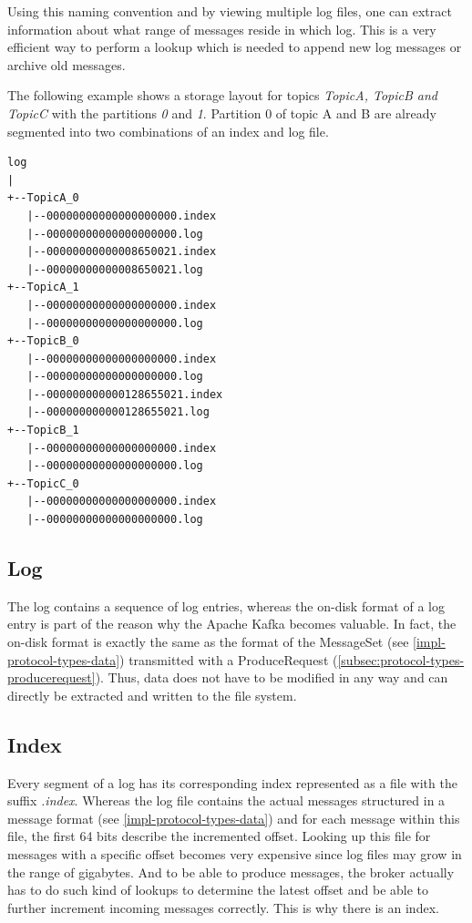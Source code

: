 Using this naming convention and by
viewing multiple log files, one can extract information about what range of
messages reside in which log. This is a very efficient way to perform a lookup
which is needed to append new log messages or archive old messages.

The following example shows a storage layout for topics \textit{TopicA, TopicB and TopicC} with the
partitions \textit{0} and \textit{1}. Partition 0 of topic A and B are already
segmented into two combinations of an index and log file. 
\begin{verbatim}
log
|
+--TopicA_0
   |--00000000000000000000.index
   |--00000000000000000000.log
   |--00000000000008650021.index
   |--00000000000008650021.log
+--TopicA_1
   |--00000000000000000000.index
   |--00000000000000000000.log
+--TopicB_0
   |--00000000000000000000.index
   |--00000000000000000000.log
   |--000000000000128655021.index
   |--000000000000128655021.log
+--TopicB_1
   |--00000000000000000000.index
   |--00000000000000000000.log
+--TopicC_0
   |--00000000000000000000.index
   |--00000000000000000000.log
\end{verbatim}

\newpage
\subsection{Log}

The log contains a sequence of log entries, whereas the on-disk format of a log
entry is part of the reason why the Apache Kafka becomes valuable. In
fact, the on-disk format is exactly the same as the format of the MessageSet
(see \ref{impl-protocol-types-data}) transmitted with a ProduceRequest
(\ref{subsec:protocol-types-producerequest}). Thus, data does not have to be
modified in any way and can directly be extracted and written to the file
system.

\subsection{Index}
Every segment of a log has its corresponding index represented as a file with
the suffix \textit{.index}. Whereas the log file contains the actual messages structured in a
message format (see \ref{impl-protocol-types-data}) and for each message within
this file, the first 64 bits describe the incremented offset. Looking up
this file for messages with a specific offset becomes very expensive since log
files may grow in the range of gigabytes. And to be able to produce messages,
the broker actually has to do such kind of lookups to determine the latest
offset and be able to further increment incoming messages correctly. This is why
there is an index.

